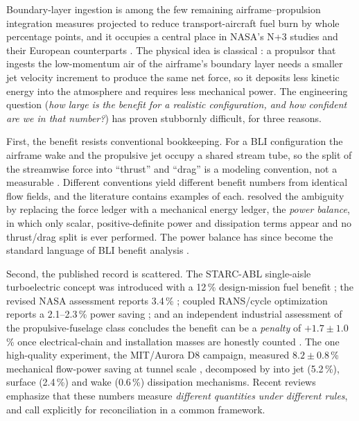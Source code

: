 \documentclass[10pt]{article}
\begin{document}
Boundary-layer ingestion is among the few remaining airframe--propulsion
integration measures projected to reduce transport-aircraft fuel burn by
whole percentage points, and it occupies a central place in NASA's N+3
studies and their European counterparts \citep{welstead2016, seitz2021,
kim2014}. The physical idea is classical \citep{smith1993}: a propulsor that
ingests the low-momentum air of the airframe's boundary layer needs a
smaller jet velocity increment to produce the same net force, so it deposits
less kinetic energy into the atmosphere and requires less mechanical power.
The engineering question (\emph{how large is the benefit for a realistic
configuration, and how confident are we in that number?}) has proven
stubbornly difficult, for three reasons.

First, the benefit resists conventional bookkeeping. For a BLI
configuration the airframe wake and the propulsive jet occupy a shared
stream tube, so the split of the streamwise force into ``thrust'' and
``drag'' is a modeling convention, not a measurable \citep{drela2009}.
Different conventions yield different benefit numbers from identical flow
fields, and the literature contains examples of each. \citet{drela2009}
resolved the ambiguity by replacing the force ledger with a mechanical
energy ledger, the \emph{power balance}, in which only scalar,
positive-definite power and dissipation terms appear and no thrust/drag
split is ever performed. The power balance has since become the standard
language of BLI benefit analysis \citep{hall2017, uranga2017}.

Second, the published record is scattered. The STARC-ABL single-aisle
turboelectric concept was introduced with a 12\,\% design-mission fuel
benefit \citep{welstead2016}; the revised NASA assessment reports 3.4\,\%
\citep{felder2022}; coupled RANS/cycle optimization reports a 2.1--2.3\,\%
power saving \citep{yildirim2022}; and an independent industrial assessment
of the propulsive-fuselage class concludes the benefit can be a
\emph{penalty} of $+1.7\pm1.0$\,\% once electrical-chain and installation
masses are honestly counted \citep{giannakakis2020}. The one high-quality
experiment, the MIT/Aurora D8 campaign, measured $8.2\pm0.8$\,\% mechanical
flow-power saving at tunnel scale \citep{uranga2017}, decomposed by
\citet{hall2017} into jet (5.2\,\%), surface (2.4\,\%) and wake (0.6\,\%)
dissipation mechanisms. Recent reviews \citep{moirou2023, ma2025} emphasize
that these numbers measure \emph{different quantities under different
rules}, and call explicitly for reconciliation in a common framework.
\end{document}

